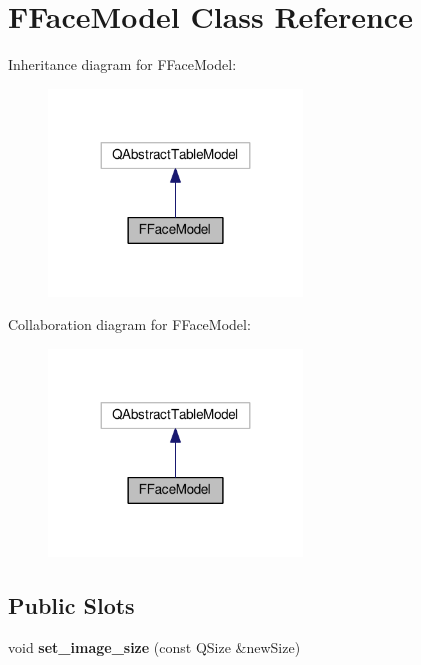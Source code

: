 \hypertarget{classFFaceModel}{}\section{F\+Face\+Model Class Reference}
\label{classFFaceModel}


Inheritance diagram for F\+Face\+Model\+:
\nopagebreak
\begin{figure}[H]
\begin{center}
\leavevmode
\includegraphics[width=191pt]{classFFaceModel__inherit__graph}
\end{center}
\end{figure}


Collaboration diagram for F\+Face\+Model\+:
\nopagebreak
\begin{figure}[H]
\begin{center}
\leavevmode
\includegraphics[width=191pt]{classFFaceModel__coll__graph}
\end{center}
\end{figure}
\subsection*{Public Slots}
\begin{DoxyCompactItemize}
\item 
\mbox{\label{classFFaceModel_adcef175f955952d2818af98f2a3d7df0}} 
void {\bfseries set\+\_\+image\+\_\+size} (const Q\+Size \&new\+Size)
\end{DoxyCompactItemize}
